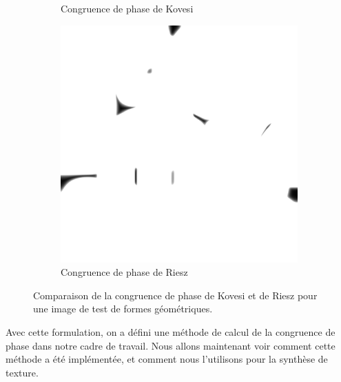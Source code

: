 \begin{figure}
\begin{subfigure}{.3\textwidth}
        \caption{Congruence de phase de Kovesi}
    \end{subfigure}
    \hfill
    \begin{subfigure}{.3\textwidth}
        \centering
        \includegraphics[width=\textwidth]{contenu/resources/images/geometric_shapes_pc_riesz}
        \caption{Congruence de phase de Riesz}
    \end{subfigure}

    \caption{Comparaison de la congruence de phase de Kovesi et de Riesz pour une image de test de formes géométriques.}
    \label{fig:phase-congruency-riesz}
\end{figure}

\bigskip

Avec cette formulation, on a défini une méthode de calcul de la congruence de phase dans notre cadre de travail. Nous allons maintenant voir comment cette méthode a été implémentée, et comment nous l'utilisons pour la synthèse de texture.
